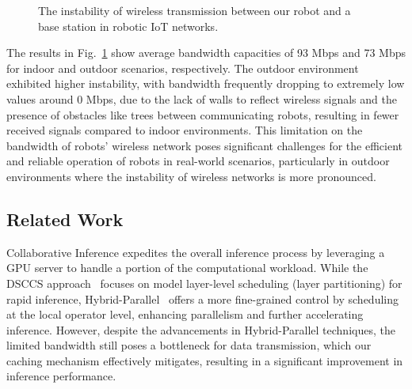 \begin{figure}[htp]
    \centering
    \hfil
    \caption{The instability of wireless transmission between our robot and a base station in robotic IoT networks.}
    \label{fig:bandwidth} 
\end{figure}


The results in Fig.~\ref{fig:bandwidth} show average bandwidth capacities of 93 Mbps and 73 Mbps for indoor and outdoor scenarios, respectively. 
The outdoor environment exhibited higher instability, with bandwidth frequently dropping to extremely low values around 0 Mbps, due to the lack of walls to reflect wireless signals and the presence of obstacles like trees between communicating robots, resulting in fewer received signals compared to indoor environments. This limitation on the bandwidth of robots' wireless network poses significant challenges for the efficient and reliable operation of robots in real-world scenarios, particularly in outdoor environments where the instability of wireless networks is more pronounced.

\subsection{Related Work}
Collaborative Inference expedites the overall inference process by leveraging a GPU server to handle a portion of the computational workload. 
While the DSCCS approach~\cite{liang2023dnn} focuses on model layer-level scheduling (layer partitioning) for rapid inference, Hybrid-Parallel~\cite{sun2024hybridparallel} offers a more fine-grained control by scheduling at the local operator level, enhancing parallelism and further accelerating inference. 
However, despite the advancements in Hybrid-Parallel techniques, the limited bandwidth still poses a bottleneck for data transmission, which our caching mechanism effectively mitigates, resulting in a significant improvement in inference performance.

